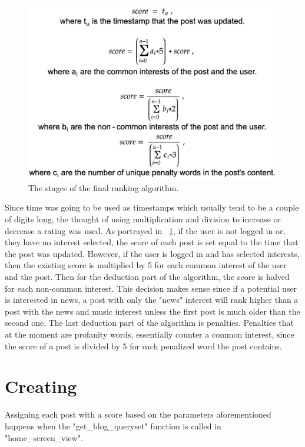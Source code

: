 \begin{figure}
  \includegraphics[scale=0.4]{Figures/algorithm}
  \caption{The stages of the final ranking algorithm.}
  \label{fig:algorithm}
\end{figure}

Since time was going to be used as timestamps which usually tend to be a couple of digits long, the thought of using multiplication and division to increase or decrease a rating was used. As portrayed in ~\ref{fig:algorithm}, if the user is not logged in or, they have no interest selected, the score of each post is set equal to the time that the post was updated. However, if the user is logged in and has selected interests, then the existing score is multiplied by 5 for each common interest of the user and the post. Then for the deduction part of the algorithm, the score is halved for each non-common interest. This decision makes sense since if a potential user is interested in news, a post with only the "news" interest will rank higher than a post with the news and music interest unless the first post is much older than the second one. The last deduction part of the algorithm is penalties. Penalties that at the moment are profanity words, essentially counter a common interest, since the score of a post is divided by 5 for each penalized word the post contains.

\section {Creating}

Assigning each post with a score based on the parameters aforementioned happens when the "get\_blog\_queryset" function is called in "home\_screen\_view".

